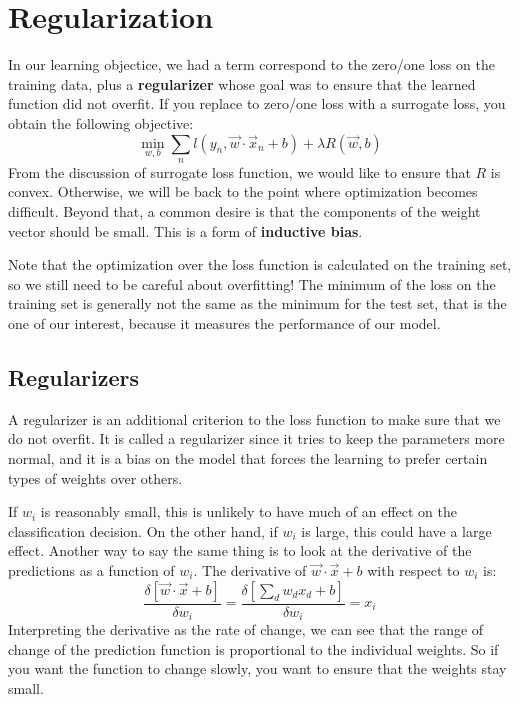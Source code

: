 \chapter{Regularization}

In our learning objectice, we had a term correspond to the zero/one loss on the training data, plus a \textbf{regularizer} whose goal was to ensure that the learned function did not overfit. If you replace to zero/one loss with a surrogate loss, you obtain the following objective:
\begin{equation}
    \min_{w,b} \sum_n l(y_n, \vec{w} \cdot \vec{x}_n + b) + \lambda R(\vec{w},b)
\end{equation}
From the discussion of surrogate loss function, we would like to ensure that \(R\) is convex. Otherwise, we will be back to the point where optimization becomes difficult. Beyond that, a common desire is that the components of the weight vector should be small. This is a form of \textbf{inductive bias}.

Note that the optimization over the loss function is calculated on the training set, so we still need to be careful about overfitting! The minimum of the loss on the training set is generally not the same as the minimum for the test set, that is the one of our interest, because it measures the performance of our model.

\section{Regularizers}
A regularizer is an additional criterion to the loss function to make sure that we do not overfit. It is called a regularizer since it tries to keep the parameters more normal, and it is a bias on the model that forces the learning to prefer certain types of weights over others.

If \(w_i\) is reasonably small, this is unlikely to have much of an effect on the classification decision. On the other hand, if \(w_i\) is large, this could have a large effect. 
Another way to say the same thing is to look at the derivative of the predictions as a function of \(w_i\). The derivative of \(\vec{w} \cdot \vec{x} + b\) with respect to \(w_i\) is:
\begin{equation}
    \frac {\delta [\vec{w} \cdot \vec{x} + b]} {\delta w_i} = \frac {\delta [\sum_d w_d x_d + b]} {\delta w_i} = x_i
\end{equation}
Interpreting the derivative as the rate of change, we can see that the range of change of the prediction function is proportional to the individual weights. So if you want the function to change slowly, you want to ensure that the weights stay small.

